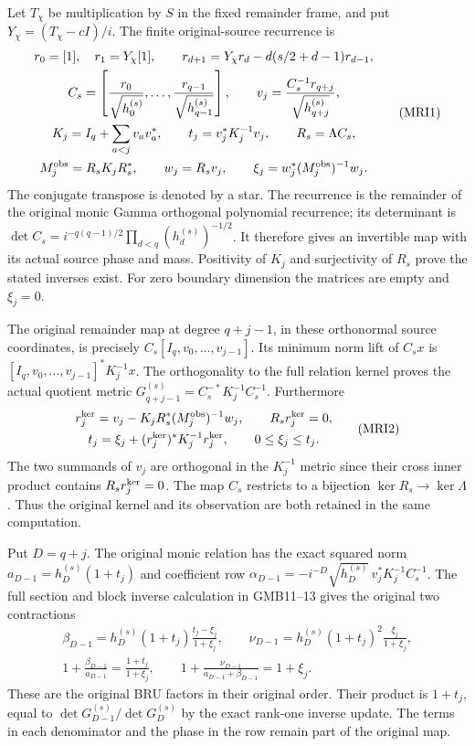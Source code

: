 Let $T_\chi$ be multiplication by $S$ in the fixed remainder
frame, and put $Y_\chi=(T_\chi-cI)/i$. The finite original-source
recurrence is
\[
\begin{gathered}
 r_0=[1],\quad r_1=Y_\chi[1],\qquad
 r_{d+1}=Y_\chi r_d-d(s/2+d-1)r_{d-1},\\
 C_s=\left[\frac{r_0}{\sqrt{h_0^{(s)}}},\ldots,
          \frac{r_{q-1}}{\sqrt{h_{q-1}^{(s)}}}\right],\qquad
 v_j=\frac{C_s^{-1}r_{q+j}}{\sqrt{h_{q+j}^{(s)}}},\\
 K_j=I_q+\sum_{a<j}v_av_a^*,\qquad
 t_j=v_j^*K_j^{-1}v_j,\qquad R_s=\Lambda C_s,\\
 M_j^{\rm obs}=R_sK_jR_s^*,\qquad
 w_j=R_sv_j,\qquad
 \xi_j=w_j^*(M_j^{\rm obs})^{-1}w_j.
\end{gathered}\tag{MRI1}
\]
The conjugate transpose is denoted by a star. The recurrence is
the remainder of the original monic Gamma orthogonal polynomial
recurrence; its determinant is
$\det C_s=i^{-q(q-1)/2}\prod_{d<q}(h_d^{(s)})^{-1/2}$.
It therefore gives an invertible map with its actual source
phase and mass. Positivity of $K_j$ and surjectivity of $R_s$
prove the stated inverses exist. For zero boundary dimension
the matrices are empty and $\xi_j=0$.

The original remainder map at degree $q+j-1$, in these orthonormal
source coordinates, is precisely
$C_s[I_q,v_0,\ldots,v_{j-1}]$. Its minimum norm lift of $C_sx$
is $[I_q,v_0,\ldots,v_{j-1}]^*K_j^{-1}x$. The orthogonality to
the full relation kernel proves the actual quotient metric
$G_{q+j-1}^{(s)}=C_s^{-*}K_j^{-1}C_s^{-1}$.
Furthermore
\[
\begin{gathered}
 r_j^{\rm ker}=v_j-K_jR_s^*(M_j^{\rm obs})^{-1}w_j,
 \qquad R_sr_j^{\rm ker}=0,\\
 t_j=\xi_j+(r_j^{\rm ker})^*K_j^{-1}r_j^{\rm ker},
 \qquad0\le\xi_j\le t_j.
\end{gathered}\tag{MRI2}
\]
The two summands of $v_j$ are orthogonal in the $K_j^{-1}$
metric since their cross inner product contains $R_sr_j^{\rm ker}=0$.
The map $C_s$ restricts to a bijection
$\ker R_s\to\ker\Lambda$. Thus the original kernel and its
observation are both retained in the same computation.

Put $D=q+j$. The original monic relation has the exact squared
norm $a_{D-1}=h_D^{(s)}(1+t_j)$ and coefficient row
$\alpha_{D-1}=-i^{-D}\sqrt{h_D^{(s)}}\,
v_j^*K_j^{-1}C_s^{-1}$. The full section and block inverse
calculation in GMB11--13 gives the original two contractions
\[
\begin{gathered}
 \beta_{D-1}=h_D^{(s)}(1+t_j)\frac{t_j-\xi_j}{1+\xi_j},
 \qquad
 \nu_{D-1}=h_D^{(s)}(1+t_j)^2\frac{\xi_j}{1+\xi_j},\\
 1+\frac{\beta_{D-1}}{a_{D-1}}
          =\frac{1+t_j}{1+\xi_j},\qquad
 1+\frac{\nu_{D-1}}{a_{D-1}+\beta_{D-1}}=1+\xi_j.
\end{gathered}\tag{MRI3}
\]
These are the original BRU factors in their original order. Their
product is $1+t_j$, equal to
$\det G_{D-1}^{(s)}/\det G_D^{(s)}$ by the exact rank-one
inverse update. The terms in each denominator and the phase in
the row remain part of the original map.

